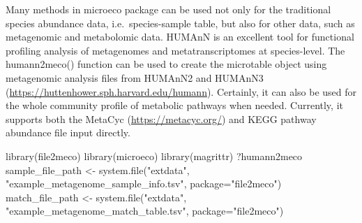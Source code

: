 \documentclass[
]{book}
\newenvironment{Shaded}{\begin{snugshade}}{\end{snugshade}}
\newcommand{\AttributeTok}[1]{\textcolor[rgb]{0.77,0.63,0.00}{#1}}
\newcommand{\FunctionTok}[1]{\textcolor[rgb]{0.00,0.00,0.00}{#1}}
\newcommand{\NormalTok}[1]{#1}
\newcommand{\OtherTok}[1]{\textcolor[rgb]{0.56,0.35,0.01}{#1}}
\newcommand{\StringTok}[1]{\textcolor[rgb]{0.31,0.60,0.02}{#1}}
\begin{document}
Many methods in microeco package can be used not only for the traditional species abundance data, i.e.~species-sample table,
but also for other data, such as metagenomic and metabolomic data.
HUMAnN \citep{Franzosa_Species_2018} is an excellent tool for functional profiling analysis of metagenomes and metatranscriptomes at species-level.
The humann2meco() function can be used to create the microtable object using metagenomic analysis files from HUMAnN2 and HUMAnN3 (\url{https://huttenhower.sph.harvard.edu/humann}).
Certainly, it can also be used for the whole community profile of metabolic pathways when needed.
Currently, it supports both the MetaCyc (\url{https://metacyc.org/}) and KEGG pathway abundance file input directly.

\begin{Shaded}
\begin{Highlighting}[]
\FunctionTok{library}\NormalTok{(file2meco)}
\FunctionTok{library}\NormalTok{(microeco)}
\FunctionTok{library}\NormalTok{(magrittr)}
\NormalTok{?humann2meco}
\NormalTok{sample\_file\_path }\OtherTok{\textless{}{-}} \FunctionTok{system.file}\NormalTok{(}\StringTok{"extdata"}\NormalTok{, }\StringTok{"example\_metagenome\_sample\_info.tsv"}\NormalTok{, }\AttributeTok{package=}\StringTok{"file2meco"}\NormalTok{)}
\NormalTok{match\_file\_path }\OtherTok{\textless{}{-}} \FunctionTok{system.file}\NormalTok{(}\StringTok{"extdata"}\NormalTok{, }\StringTok{"example\_metagenome\_match\_table.tsv"}\NormalTok{, }\AttributeTok{package=}\StringTok{"file2meco"}\NormalTok{)}


\end{Highlighting}
\end{Shaded}
\end{document}
